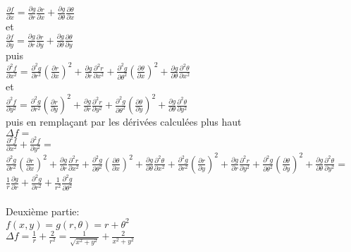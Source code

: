 \begin{myExample}
	$\frac{\partial f}{\partial x}=\frac{\partial g}{\partial r}\frac{\partial r}{\partial x}+\frac{\partial g}{\partial \theta}\frac{\partial \theta}{\partial x}$
	\\ et
	\\
	$\frac{\partial f}{\partial y}=\frac{\partial g}{\partial r}\frac{\partial r}{\partial y}+\frac{\partial g}{\partial \theta}\frac{\partial \theta}{\partial y}$
	\\puis
	\\
	$\frac{\partial^2 f}{\partial x^2}=\frac{\partial^2 g}{\partial r^2}(\frac{\partial r}{\partial x})^2+\frac{\partial g}{\partial r}\frac{\partial^2 r}{\partial x^2}+\frac{\partial^2 g}{\partial \theta^2}(\frac{\partial \theta}{\partial x})^2+\frac{\partial g}{\partial \theta}\frac{\partial^2 \theta}{\partial x^2}$
	\\et
	\\
	$\frac{\partial^2 f}{\partial y^2}=\frac{\partial^2 g}{\partial r^2}(\frac{\partial r}{\partial y})^2+\frac{\partial g}{\partial r}\frac{\partial^2 r}{\partial y^2}+\frac{\partial^2 g}{\partial \theta^2}(\frac{\partial \theta}{\partial y})^2+\frac{\partial g}{\partial \theta}\frac{\partial^2 \theta}{\partial y^2}$
	\\
	puis en remplaçant par les dérivées calculées plus haut
	\\
	$\Delta f=$
	\\
	$\frac{\partial^2 f}{\partial x^2}+\frac{\partial^2 f}{\partial y^2}=$
	\\$\frac{\partial^2 g}{\partial r^2}(\frac{\partial r}{\partial x})^2+\frac{\partial g}{\partial r}\frac{\partial^2 r}{\partial x^2}+\frac{\partial^2 g}{\partial \theta^2}(\frac{\partial \theta}{\partial x})^2+\frac{\partial g}{\partial \theta}\frac{\partial^2 \theta}{\partial x^2}+\frac{\partial^2 g}{\partial r^2}(\frac{\partial r}{\partial y})^2+\frac{\partial g}{\partial r}\frac{\partial^2 r}{\partial y^2}+\frac{\partial^2 g}{\partial \theta^2}(\frac{\partial \theta}{\partial y})^2+\frac{\partial g}{\partial \theta}\frac{\partial^2 \theta}{\partial y^2}=$
	\\$\frac{1}{r}\frac{\partial g}{\partial r}+\frac{\partial^2 g}{\partial r^2}+\frac{1}{r^2}\frac{\partial^2 g}{\partial \theta^2}$
	\\\\
	Deuxième partie:
	\\
	$f(x,y)=g(r,\theta)=r+\theta^2$
	\\
	$\Delta f=\frac{1}{r}+\frac{2}{r^2}=\frac{1}{\sqrt{x^2+y^2}}+\frac{2}{x^2+y^2}$
	
\end{myExample}